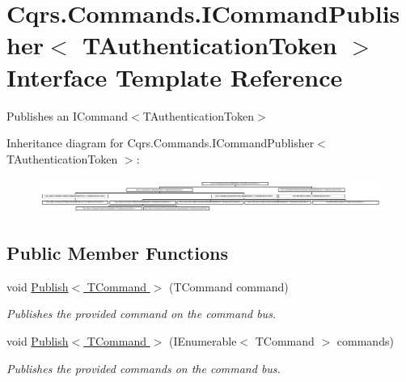 \hypertarget{interfaceCqrs_1_1Commands_1_1ICommandPublisher}{}\section{Cqrs.\+Commands.\+I\+Command\+Publisher$<$ T\+Authentication\+Token $>$ Interface Template Reference}
\label{interfaceCqrs_1_1Commands_1_1ICommandPublisher}


Publishes an I\+Command$<$\+T\+Authentication\+Token$>$  


Inheritance diagram for Cqrs.\+Commands.\+I\+Command\+Publisher$<$ T\+Authentication\+Token $>$\+:\begin{figure}[H]
\begin{center}
\leavevmode
\includegraphics[height=1.159420cm]{interfaceCqrs_1_1Commands_1_1ICommandPublisher}
\end{center}
\end{figure}
\subsection*{Public Member Functions}
\begin{DoxyCompactItemize}
\item 
void \hyperlink{interfaceCqrs_1_1Commands_1_1ICommandPublisher_aeeb487ad5686d9c44d214b1daaf7833a_aeeb487ad5686d9c44d214b1daaf7833a}{Publish$<$ T\+Command $>$} (T\+Command command)
\begin{DoxyCompactList}\small\item\em Publishes the provided {\itshape command}  on the command bus. \end{DoxyCompactList}\item 
void \hyperlink{interfaceCqrs_1_1Commands_1_1ICommandPublisher_af0f033c0b949e5650032e4f00b11b595_af0f033c0b949e5650032e4f00b11b595}{Publish$<$ T\+Command $>$} (I\+Enumerable$<$ T\+Command $>$ commands)
\begin{DoxyCompactList}\small\item\em Publishes the provided {\itshape commands}  on the command bus. \end{DoxyCompactList}\end{DoxyCompactItemize}


